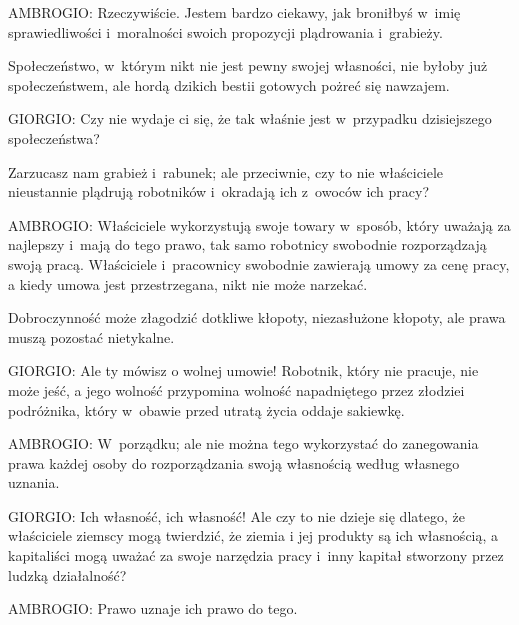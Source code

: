 \documentclass[oneside,polish,11pt,sfheadings]{mwbk}
\begin{document}
 
\noindent AMBROGIO: Rzeczywiście. Jestem bardzo ciekawy, jak broniłbyś w~imię sprawiedliwości i~moralności swoich propozycji
plądrowania i~grabieży. 

 
Społeczeństwo, w~którym nikt nie jest pewny swojej własności, nie byłoby już społeczeństwem, ale hordą dzikich bestii
gotowych pożreć się nawzajem. 




 
\noindent GIORGIO: Czy nie wydaje ci się, że tak właśnie jest w~przypadku dzisiejszego społeczeństwa? 

 
Zarzucasz nam grabież i~rabunek; ale przeciwnie, czy to nie właściciele nieustannie plądrują robotników i~okradają ich z~owoców ich pracy? 




 
\noindent AMBROGIO: Właściciele wykorzystują swoje towary w~sposób, który uważają za najlepszy i~mają do tego prawo, tak samo
robotnicy swobodnie rozporządzają swoją pracą. Właściciele i~pracownicy swobodnie zawierają umowy za cenę pracy, a
kiedy umowa jest przestrzegana, nikt nie może narzekać. 

 
Dobroczynność może złagodzić dotkliwe kłopoty, niezasłużone kłopoty, ale prawa muszą pozostać nietykalne. 




 
\noindent GIORGIO: Ale ty mówisz o wolnej umowie! Robotnik, który nie pracuje, nie może jeść, a jego wolność przypomina wolność
napadniętego przez złodziei podróżnika, który w~obawie przed utratą życia oddaje sakiewkę. 




 
\noindent AMBROGIO: W~porządku; ale nie można tego wykorzystać do zanegowania prawa każdej osoby do rozporządzania swoją
własnością według własnego uznania. 




 
\noindent GIORGIO: Ich własność, ich własność! Ale czy to nie dzieje się dlatego, że właściciele ziemscy mogą twierdzić, że ziemia
i jej produkty są ich własnością, a kapitaliści mogą uważać za swoje narzędzia pracy i~inny kapitał stworzony przez
ludzką działalność? 




 
\noindent AMBROGIO: Prawo uznaje ich prawo do tego. 
\end{document}
